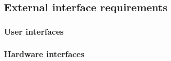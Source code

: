 \documentclass[12pt]{article}
\begin{document}


  \subsection{External interface requirements}
    \subsubsection{User interfaces}
    \subsubsection{Hardware interfaces}
\end{document}
